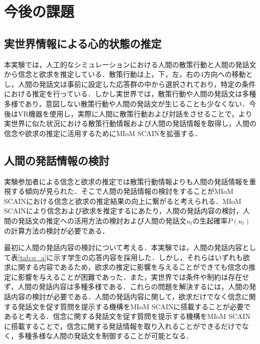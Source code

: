 \chapter{今後の課題}

\section{実世界情報による心的状態の推定}
本実験では，人工的なシミュレーションにおける人間の散策行動と人間の発話文から信念と欲求を推定している．散策行動は上，下，左，右の4方向への移動とし，人間の発話文は事前に設定した応答群の中から選択されており，特定の条件における推定を行っている．しかし実世界では，散策行動や人間の発話文は多種多様であり，意図しない散策行動や人間の発話文が生じることも少なくない．今後はVR機器を使用し，実際に人間に散策行動および対話をさせることで，より実世界に似た状況における散策行動情報および人間の発話情報を取得し，人間の信念や欲求の推定に活用するためにMIoM SCAINを拡張する．

\section{人間の発話情報の検討}

\par
実験参加者による信念と欲求の推定では散策行動情報よりも人間の発話情報を重視する傾向が見られた．そこで人間の発話情報の検討をすることがMIoM SCAINにおける信念と欲求の推定結果の向上に繋がると考えられる．MIoM SCAINにより信念および欲求を推定するにあたり，人間の発話内容の検討，人間の発話文の推定への活用方法の検討および人間の発話文$u_t$の生起確率$P(u_t)$の計算方法の検討が必要である．

\par
最初に人間の発話内容の検討について考える．本実験では，人間の発話内容として表\ref{tab:q_a}に示す学生の応答内容を採用した．しかし，それらはいずれも欲求に関する内容であるため，欲求の推定に影響を与えることができても信念の推定に影響を与えることが困難であった．また，実世界では条件や制約は存在せず，人間の発話内容は多種多様である．これらの問題を解決するには，人間の発話内容の検討が必要である．人間の発話内容に関して，欲求だけでなく信念に関する発話文を促す質問を提示する機構をMIoM SCAINに搭載することが必要であると考える．信念に関する発話文を促す質問を提示する機構をMIoM SCAINに搭載することで，信念に関する発話情報を取り入れることができるだけでなく，多種多様な人間の発話文を制御することが可能となる．

